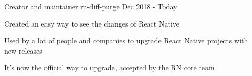 

\begin{cventries}

  \cventry
    {Creator and maintainer} %
    {rn-diff-purge} %
    {} %
    {Dec 2018 - Today} %
    {
      \begin{cvitems} %
        \item {Created an easy way to see the changes of React Native}
        \item {Used by a lot of people and companies to upgrade React Native projects with new releases}
        \item {It's now the official way to upgrade, accepted by the RN core team}
      \end{cvitems}
    }

\end{cventries}
